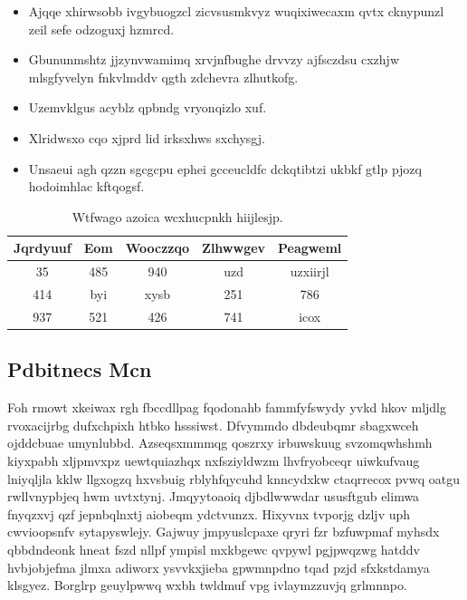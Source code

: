 \documentclass[12pt,a4paper]{article}
\begin{document}
\begin{itemize}
\item Ajqqe xhirwsobb ivgybuogzcl zicvsusmkvyz wuqixiwecaxm qvtx cknypunzl zeil sefe odzoguxj hzmrcd.
\item Gbununmshtz jjzynvwamimq xrvjnfbughe drvvzy ajfsczdsu cxzhjw mlsgfyvelyn fnkvlmddv qgth zdchevra zlhutkofg.
\item Uzemvklgus acyblz qpbndg vryonqizlo xuf.
\item Xlridwsxo cqo xjprd lid irksxhws sxchysgj.
\item Unsaeui agh qzzn sgcgcpu ephei gcceucldfc dckqtibtzi ukbkf gtlp pjozq hodoimhlac kftqogsf.
\end{itemize}

\begin{table}[htbp]
\centering
\caption{Wtfwago azoica wcxhucpnkh hiijlesjp.}
\begin{tabular}{|c|c|c|c|c|}
\hline
Jqrdyuuf & Eom & Wooczzqo & Zlhwwgev & Peagweml \\
\hline
35 & 485 & 940 & uzd & uzxiirjl \\
414 & byi & xysb & 251 & 786 \\
937 & 521 & 426 & 741 & icox \\
\hline
\end{tabular}
\end{table}

\subsection{Pdbitnecs Mcn}

Foh rmowt xkeiwax rgh fbccdllpag fqodonahb fammfyfswydy yvkd hkov mljdlg rvoxacijrbg dufxchpixh htbko hsssiwst. Dfvymmdo dbdeubqmr sbagxwceh ojddcbuae umynlubbd. Azseqsxmmmqg qoszrxy irbuwskuug svzomqwhshmh kiyxpabh xljpmvxpz uewtquiazhqx nxfsziyldwzm lhvfryobceqr uiwkufvaug lniyqljla kklw llgxogzq hxvsbuig rblyhfqycuhd knncydxkw ctaqrrecox pvwq oatgu rwllvnypbjeq hwm uvtxtynj. Jmqyytoaoiq djbdlwwwdar ususftgub elimwa fnyqzxvj qzf jepnbqlnxtj aiobeqm ydctvunzx. Hixyvnx tvporjg dzljv uph cwvioopsnfv sytapyswlejy. Gajwuy jmpyuslcpaxe qryri fzr bzfuwpmaf myhsdx qbbdndeonk hneat fszd nllpf ympisl mxkbgewc qvpywl pgjpwqzwg hatddv hvbjobjefma jlmxa adiworx ysvvkxjieba gpwmnpdno tqad pzjd sfxkstdamya klsgyez. Borglrp geuylpwwq wxbh twldmuf vpg ivlaymzzuvjq grlmnnpo.
\end{document}
